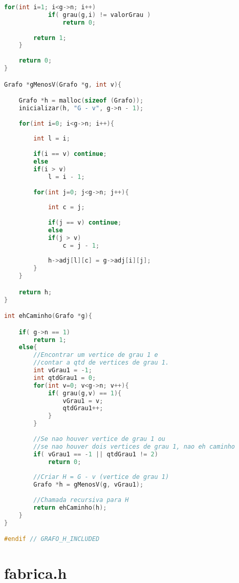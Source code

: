 \documentclass[12pt,a4paper,oneside]{article}
\begin{document}
\begin{lstlisting}[language=C]
		for(int i=1; i<g->n; i++)
			if( grau(g,i) != valorGrau )
				return 0;
	
		return 1;
	}
	
	return 0;
}

Grafo *gMenosV(Grafo *g, int v){

	Grafo *h = malloc(sizeof (Grafo));
	inicializar(h, "G - v", g->n - 1);
	
	for(int i=0; i<g->n; i++){
	
		int l = i;
		
		if(i == v) continue;
		else
		if(i > v)
			l = i - 1;
		
		for(int j=0; j<g->n; j++){
		
			int c = j;
			
			if(j == v) continue;
			else
			if(j > v)
				c = j - 1;
			
			h->adj[l][c] = g->adj[i][j];
		}
	}

	return h;
}

int ehCaminho(Grafo *g){

	if( g->n == 1)
		return 1;
	else{
		//Encontrar um vertice de grau 1 e
		//contar a qtd de vertices de grau 1.
		int vGrau1 = -1;
		int qtdGrau1 = 0;
		for(int v=0; v<g->n; v++){
			if( grau(g,v) == 1){
				vGrau1 = v;
				qtdGrau1++;
			}
		}
	
		//Se nao houver vertice de grau 1 ou
		//se nao houver dois vertices de grau 1, nao eh caminho
		if( vGrau1 == -1 || qtdGrau1 != 2)
			return 0;
		
		//Criar H = G - v (vertice de grau 1)
		Grafo *h = gMenosV(g, vGrau1);
		
		//Chamada recursiva para H
		return ehCaminho(h);
	}
}

#endif // GRAFO_H_INCLUDED\end{lstlisting}

\newpage

\section{fabrica.h}
\end{document}
